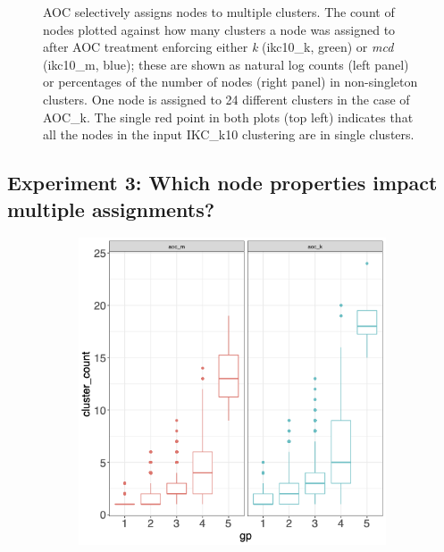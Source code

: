 \documentclass[12pt, oneside]{article}   	%
\begin{document}
{\begin{figure}[H]
\begin{subfigure}[t]{0.48\textwidth}
\end{subfigure}
\captionsetup{width=0.9\textwidth}	
\caption{AOC selectively assigns nodes to multiple clusters. The count of nodes plotted against how many clusters a node was assigned to after AOC treatment enforcing either \emph{k} (ikc10\_k, green) or \emph{mcd} (ikc10\_m, blue);  these are shown as natural log counts (left panel) or percentages of the number of nodes (right panel) in non-singleton clusters. One node is assigned to 24 different clusters in the case of AOC\_k. The single red point in both plots (top left) indicates that all the nodes in the input IKC\_k10 clustering are in single clusters.}
\label{fig:fig2}
\end{figure}
	
\subsection{Experiment 3: Which node properties impact multiple assignments?}
\begin{figure}
\centering
\begin{subfigure}[t]{0.48\textwidth}
\centering
\includegraphics[width=\linewidth]{cluster_group.png} 
\end{subfigure}
\hfill
\begin{subfigure}[t]{0.48\textwidth}

\end{subfigure}
\end{figure}}
\end{document}

